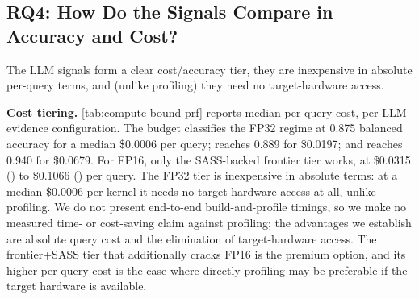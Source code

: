 \subsection{RQ4: How Do the Signals Compare in Accuracy and Cost?}

The LLM signals form a clear cost/accuracy tier, they are inexpensive in absolute per-query terms, and (unlike profiling) they need no target-hardware access.

\noindent\textbf{Cost tiering.}
\autoref{tab:compute-bound-prf} reports median per-query cost, per LLM-evidence configuration.
The budget \gptoss classifies the \sourceonly FP32 regime at 0.875 balanced accuracy for a median \$0.0006 per query; \gptfivefour reaches 0.889 for \$0.0197; and \opus reaches 0.940 for \$0.0679.
For FP16, only the SASS-backed frontier tier works, at \$0.0315 (\gptfivefour) to \$0.1066 (\opus) per query.
The \sourceonly FP32 tier is inexpensive in absolute terms: at a median \$0.0006 per kernel it needs no target-hardware access at all, unlike profiling.
We do not present end-to-end build-and-profile timings, so we make no measured time- or cost-saving claim against profiling; the advantages we establish are absolute query cost and the elimination of target-hardware access.
The frontier+SASS tier that additionally cracks FP16 is the premium option, and its higher per-query cost is the case where directly profiling may be preferable if the target hardware is available.

